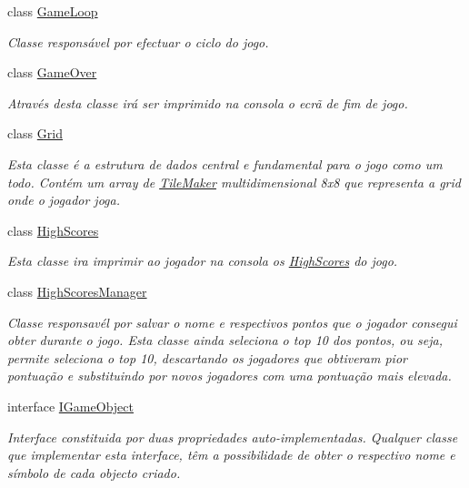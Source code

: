 \begin{DoxyCompactItemize}
class \mbox{\hyperlink{class_projeto2___l_p1_1_1_game_loop}{Game\+Loop}}
\begin{DoxyCompactList}\small\item\em Classe responsável por efectuar o ciclo do jogo. \end{DoxyCompactList}\item 
class \mbox{\hyperlink{class_projeto2___l_p1_1_1_game_over}{Game\+Over}}
\begin{DoxyCompactList}\small\item\em Através desta classe irá ser imprimido na consola o ecrã de fim de jogo. \end{DoxyCompactList}\item 
class \mbox{\hyperlink{class_projeto2___l_p1_1_1_grid}{Grid}}
\begin{DoxyCompactList}\small\item\em Esta classe é a estrutura de dados central e fundamental para o jogo como um todo. Contém um array de \mbox{\hyperlink{class_projeto2___l_p1_1_1_tile_maker}{Tile\+Maker}} multidimensional 8x8 que representa a grid onde o jogador joga. \end{DoxyCompactList}\item 
class \mbox{\hyperlink{class_projeto2___l_p1_1_1_high_scores}{High\+Scores}}
\begin{DoxyCompactList}\small\item\em Esta classe ira imprimir ao jogador na consola os \mbox{\hyperlink{class_projeto2___l_p1_1_1_high_scores}{High\+Scores}} do jogo. \end{DoxyCompactList}\item 
class \mbox{\hyperlink{class_projeto2___l_p1_1_1_high_scores_manager}{High\+Scores\+Manager}}
\begin{DoxyCompactList}\small\item\em Classe responsavél por salvar o nome e respectivos pontos que o jogador consegui obter durante o jogo. Esta classe ainda seleciona o top 10 dos pontos, ou seja, permite seleciona o top 10, descartando os jogadores que obtiveram pior pontuação e substituindo por novos jogadores com uma pontuação mais elevada. \end{DoxyCompactList}\item 
interface \mbox{\hyperlink{interface_projeto2___l_p1_1_1_i_game_object}{I\+Game\+Object}}
\begin{DoxyCompactList}\small\item\em Interface constituida por duas propriedades auto-\/implementadas. Qualquer classe que implementar esta interface, têm a possibilidade de obter o respectivo nome e símbolo de cada objecto criado. \end{DoxyCompactList}\item 

\end{DoxyCompactItemize}
